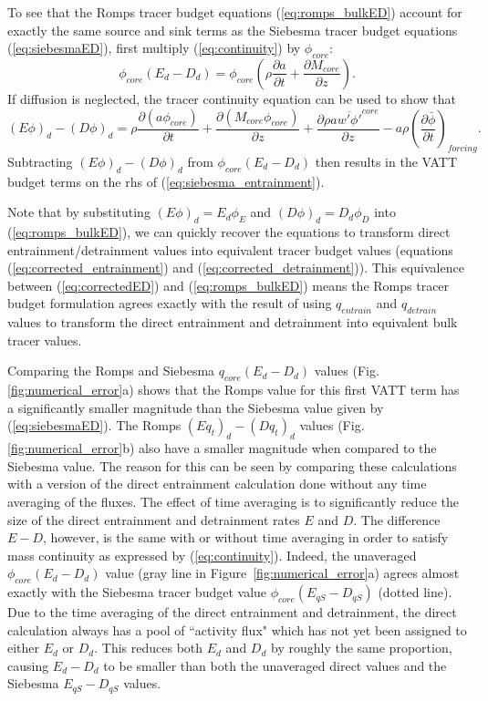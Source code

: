 \documentclass[12pt]{article}
\begin{document}
To see that the Romps tracer budget equations (\ref{eq:romps_bulkED}) account for exactly the same
source and sink terms as  the Siebesma 
tracer budget equations (\ref{eq:siebesmaED}),  first multiply  (\ref{eq:continuity})
by $\phi_{core}$:
\begin{equation}
    \phi_{core}(E_d - D_d) =
    \phi_{core} \left(\rho \frac{\partial a}{\partial t}
                    + \frac{\partial M_{core}}{\partial z}\right).
\end{equation}
If diffusion is neglected, the tracer continuity equation can be 
used to show that
\begin{equation}
    \label{tracer_budget_Ephi_minus_Dphi}
    (E\phi)_d - (D\phi)_d = 
     \rho \frac{\partial (a \phi_{core})}{\partial t}
   + \frac{\partial (M_{core} \phi_{core})}{\partial z}
   + \frac{\partial \rho a \overline{w' \phi'}^{core}}{\partial z}
   - a \rho \left(\frac{\partial \bar{\phi}}{\partial t}\right)_{forcing}.
\end{equation}
Subtracting $(E\phi)_d - (D\phi)_d$ from $\phi_{core}(E_d - D_d)$ then 
results in the VATT budget terms on the rhs of (\ref{eq:siebesma_entrainment}).  

Note that by substituting $(E \phi)_d = E_d \phi_E$ and 
$(D\phi)_d = D_d \phi_D$ into (\ref{eq:romps_bulkED}), we can quickly recover the 
equations to transform direct entrainment/detrainment values into 
equivalent tracer budget values (equations (\ref{eq:corrected_entrainment}) 
and (\ref{eq:corrected_detrainment})).  This equivalence between 
(\ref{eq:correctedED}) and (\ref{eq:romps_bulkED})
means the Romps tracer budget formulation agrees exactly with the result of 
using $q_{entrain}$ and $q_{detrain}$ values to transform the direct 
entrainment and detrainment into equivalent bulk tracer values.  

Comparing the Romps and Siebesma $q_{core}(E_d - D_d)$ values
(Fig. \ref{fig:numerical_error}a) shows that the Romps value for this
first VATT term has a significantly smaller magnitude than the
Siebesma value given by (\ref{eq:siebesmaED}).  
The Romps $(Eq_t)_d - (Dq_t)_d$ values
(Fig. \ref{fig:numerical_error}b) also have a smaller magnitude when
compared to the Siebesma value.  The reason for this can be seen by
comparing these calculations with a version of the direct entrainment
calculation done without any time averaging of the fluxes.  The effect
of time averaging is to significantly reduce the size of the direct
entrainment and detrainment rates $E$ and $D$.  The difference $E-D$,
however, is the same with or without time averaging in order to
satisfy mass continuity as expressed by (\ref{eq:continuity}).
Indeed, the unaveraged $\phi_{core}(E_d - D_d)$ value (gray line in
Figure~\ref{fig:numerical_error}a) agrees almost exactly with the
Siebesma tracer budget value $\phi_{core}(E_{qS} - D_{qS})$ (dotted
line).  Due to the time averaging of the direct entrainment and
detrainment, the direct calculation always has a pool of ``activity
flux" which has not yet been assigned to either $E_d$ or $D_d$.  This
reduces both $E_d$ and $D_d$ by roughly the same proportion, causing
$E_d-D_d$ to be smaller than both the unaveraged direct values and the
Siebesma $E_{qS}-D_{qS}$ values.
\end{document}
